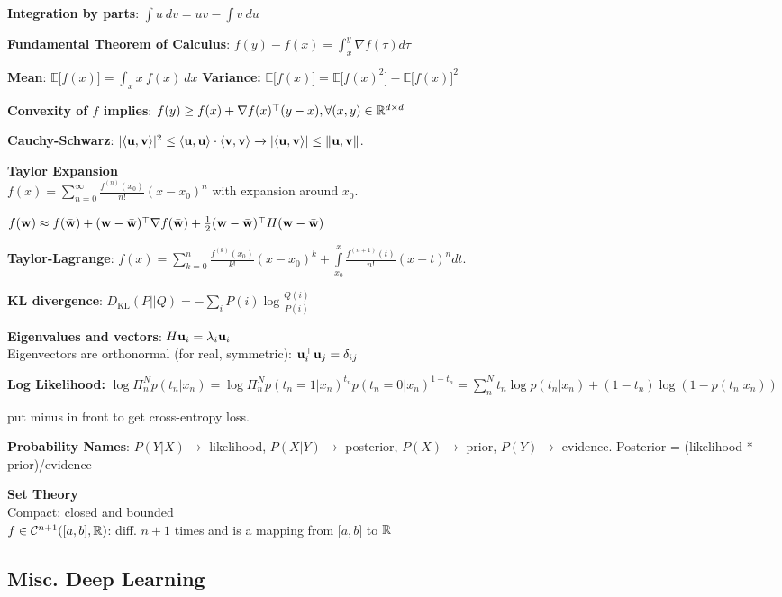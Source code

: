 \textbf{Integration by parts}: $\int u\>dv=uv - \int v\>du$

\textbf{Fundamental Theorem of Calculus}: $f(y)-f(x)=\int^y_x\nabla f(\tau) d\tau$

\textbf{Mean}: $\mathbb{E}\lbrack f(x) \rbrack = \int_x x\>f(x)\>dx$ \textbf{Variance:} $\mathbb{E}\lbrack f(x) \rbrack = \mathbb{E} \lbrack f(x)^2\rbrack - \mathbb{E} \lbrack f(x) \rbrack^2$

\textbf{Convexity of $f$ implies}: $f(y)\geq f(x)+\nabla f(x)^{\mathop{\mathrm{\top}}} (y-x), \forall (x,y) \in \mathbb R^{d\times d}$

\textbf{Cauchy-Schwarz}: $\lvert \langle \mathbf u ,\mathbf v \rangle\rvert^2\leq\langle \mathbf u,\mathbf u\rangle\cdot\langle\mathbf v,\mathbf v\rangle \xrightarrow{} \lvert\langle\mathbf u,\mathbf v\rangle\rvert\leq\lVert\mathbf u,\mathbf v\rVert $.

\textbf{Taylor Expansion}\\
\tab$f(x)=\sum\limits^\infty_{n=0}\frac{f^{(n)}(x_0)}{n!}(x-x_0)^n$ with expansion around $x_0$.

\tab$f(\mathbf w)\approx f(\bar{\mathbf w})+(\mathbf w-\bar{\mathbf w})^{\mathop{\mathrm{\top}}}\nabla f(\bar{\mathbf w})+\frac{1}{2}(\mathbf w-\bar{\mathbf w})^{\mathop{\mathrm{\top}}} H (\mathbf w-\bar{\mathbf w})$

\textbf{Taylor-Lagrange}:
$f(x)=\sum\limits^n_{k=0}\frac{f^{(k)}(x_0)}{k!}(x-x_0)^k+\int\limits^x_{x_0}\frac{f^{(n+1)}(t)}{n!}(x-t)^n dt$.

\textbf{KL divergence}: $D_\text{KL}(P||Q)=-\sum_i P(i) \log \frac{Q(i)}{P(i)}$

\textbf{Eigenvalues and vectors}: $H\mathbf u_i=\lambda_i\mathbf u_i$\\
Eigenvectors are orthonormal (for real, symmetric): $\mathbf u_i^{\mathop{\mathrm{\top}}}\mathbf u_j=\delta_{ij}$

\textbf{Log Likelihood:} $\log\Pi^N_n p(t_n|x_n)=\log\Pi^N_n p(t_n=1|x_n)^{t_n} p(t_n=0|x_n)^{1-t_n}=\sum^N_n t_n \log p(t_n|x_n) + (1-t_n) \log (1-p(t_n|x_n))$

\tab put minus in front to get cross-entropy loss.

\textbf{Probability Names}: $P(Y|X)\xrightarrow{}$ likelihood, $P(X|Y)\xrightarrow{}$ posterior, $P(X)\xrightarrow{}$ prior, $P(Y)\xrightarrow{}$ evidence. Posterior = (likelihood * prior)/evidence

\textbf{Set Theory}\\
Compact: closed and bounded\\
$f\in\mathcal{C}^{n+1}(\lbrack a,b\rbrack,\mathbb R)$: diff. $n+1$ times and is a mapping from $\lbrack a,b\rbrack$ to $\mathbb R$

\subsection*{Misc. Deep Learning}
